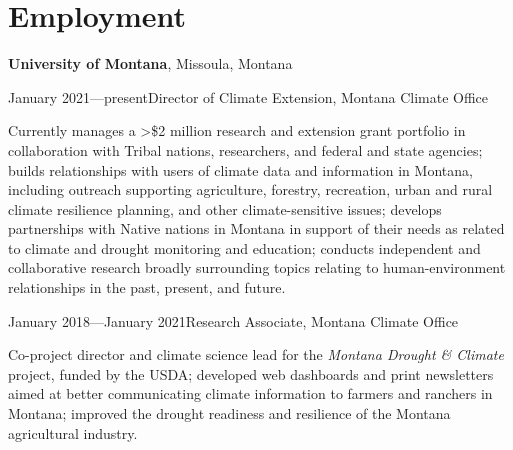 \section{Employment}

{\bf University of Montana}, Missoula, Montana
\begin{list1}

\item[] January 2021—present\hspace{.2cm}Director of Climate Extension, Montana Climate Office
\begin{list2}
\item[] Currently manages a >\$2 million research and extension grant portfolio in collaboration with Tribal nations, researchers, and federal and state agencies; builds relationships with users of climate data and information in Montana, including outreach supporting agriculture, forestry, recreation, urban and rural climate resilience planning, and other climate-sensitive issues; develops partnerships with Native nations in Montana in support of their needs as related to climate and drought monitoring and education; conducts independent and collaborative research broadly surrounding topics relating to human-environment relationships in the past, present, and future.
\end{list2}

\vspace{0.1in}

\item[] January 2018—January 2021\hspace{.2cm}Research Associate, Montana Climate Office
\begin{list2}
\item[] Co-project director and climate science lead for the \emph{Montana Drought \& Climate} project, funded by the USDA; developed web dashboards and print newsletters aimed at better communicating climate information to farmers and ranchers in Montana; improved the drought readiness and resilience of the Montana agricultural industry.
\end{list2}
\end{list1}

